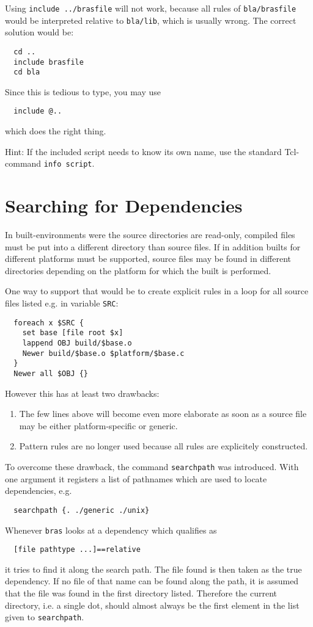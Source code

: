 \documentclass[12pt]{article}
\newcommand{\bras}{\texttt{bras}}
\begin{document}
Using \texttt{include ../brasfile} will not work, because all
rules of \texttt{bla/brasfile} would be interpreted relative to
\texttt{bla/lib}, which is usually wrong. The correct solution would
be:
\begin{verbatim}
  cd ..
  include brasfile
  cd bla
\end{verbatim}
Since this is tedious to type, you may use
\begin{verbatim}
  include @..
\end{verbatim}
which does the right thing.

Hint: If the included script needs to know its own name, use the
standard Tcl-command \texttt{info script}.
\section{Searching for Dependencies}

In built-environments were the source directories are read-only,
compiled files must be put into a different directory than source
files. If in addition builts for different platforms must be supported,
source files may be found in different directories depending on the
platform for which the built is performed.

One way to support that would be to create explicit rules in a loop
for all source files listed e.g. in variable \texttt{SRC}:
\begin{verbatim}
  foreach x $SRC {
    set base [file root $x]
    lappend OBJ build/$base.o
    Newer build/$base.o $platform/$base.c
  }
  Newer all $OBJ {}
\end{verbatim}

However this has at least two drawbacks:
\begin{enumerate}
\item The few lines above will become even more elaborate as soon as a
  source file may be either platform-specific or generic.
\item Pattern rules are no longer used because all rules are
  explicitely constructed.
\end{enumerate}

To overcome these drawback, the command \texttt{searchpath} was
introduced. With one argument it registers a list of pathnames which are
used to locate dependencies, e.g.
\begin{verbatim}
  searchpath {. ./generic ./unix}
\end{verbatim}
Whenever \bras{} looks at a dependency which qualifies as
\begin{verbatim}
  [file pathtype ...]==relative
\end{verbatim}
it tries to find it along the search path. The file found is then
taken as the true dependency. If no file of that name can be found
along the path, it is assumed that the file was found in the first
directory listed. Therefore the current directory, i.e. a single dot,
should almost always be the first element in the list given to
\texttt{searchpath}.
\end{document}
